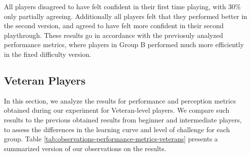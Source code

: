 All players disagreed to have felt confident in their first time playing, with 30\% only partially agreeing. Additionally all players felt that they performed better in the second version, and agreed to have felt more confident in their second playthrough. These results go in accordance with the previosuly analyzed performance metrics, where players in Group B performed much more efficiently in the fixed difficulty version.


\subsection{Veteran Players}

In this section, we analyze the results for performance and perception metrics obtained during our experiment for Veteran-level players. We compare such results to the previous obtained results from beginner and intermediate players, to assess the differences in the learning curve and level of challenge for each group. Table \ref{tab:observations-performance-metrics-veterans} presents a summarized version of our observations on the results.


